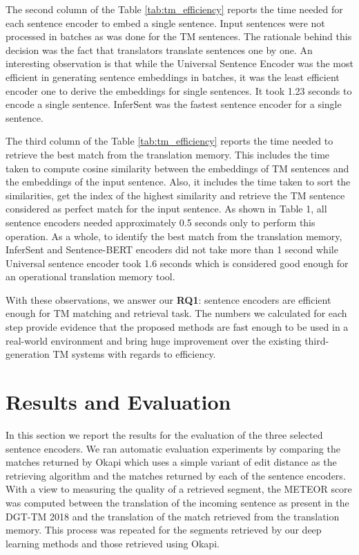 The second column of the Table \ref{tab:tm_efficiency} reports the time needed for each sentence encoder to embed a single sentence. Input sentences were not processed in batches as was done for the TM sentences. The rationale behind this decision was the fact that translators translate sentences one by one. An interesting observation is that while the Universal Sentence Encoder was the most efficient in generating sentence embeddings in batches, it was the least efficient encoder one to derive the embeddings for single sentences. It took 1.23 seconds to encode a single sentence. InferSent was the fastest sentence encoder for a single sentence. 

The third column of the Table \ref{tab:tm_efficiency} reports the time needed to retrieve the best match from the translation memory. This includes the time taken to compute cosine similarity between the embeddings of TM sentences and the embeddings of the input sentence. Also, it includes the time taken to sort the similarities, get the index of the highest similarity and retrieve the TM sentence considered as perfect match for the input sentence. As shown in Table 1, all sentence encoders needed approximately 0.5 seconds only to perform this operation. As a whole, to identify the best match from the translation memory, InferSent and Sentence-BERT encoders did not take more than 1 second while Universal sentence encoder took 1.6 seconds which is considered good enough for an operational translation memory tool. 

With these observations, we answer our \textbf{RQ1}: sentence encoders are efficient enough for TM matching and retrieval task. The numbers we calculated for each step provide evidence that the proposed methods are fast enough to be used in a real-world environment and bring huge improvement over the existing third-generation TM systems with regards to efficiency.


\section{Results and Evaluation}
\label{sec:tm_sentence_encoders_results}
In this section we report the results for the evaluation of the three selected sentence encoders. We ran automatic evaluation experiments by comparing the matches returned by Okapi which uses a simple variant of edit distance as the retrieving algorithm and the matches returned by each of the sentence encoders. With a view to measuring the quality of a retrieved segment, the METEOR score was computed between the translation of the incoming sentence as present in the DGT-TM 2018 and the translation of the match retrieved from the translation memory. This process was repeated for the segments retrieved by our deep learning methods and those retrieved using Okapi. 

